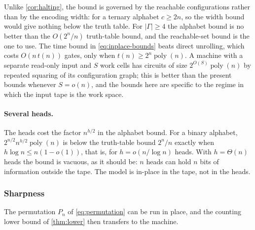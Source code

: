 \documentclass[11pt]{article}
\theoremstyle{definition}
\theoremstyle{remark}
\newcommand{\poly}{\operatorname{poly}}
\numberwithin{equation}{section}
\begin{document}
Unlike \cref{cor:halting}, the bound is governed by the reachable
configurations rather than by the encoding width: for a ternary
alphabet $c\geq2n$, so the width bound would give nothing below the
truth table.  For $|\Gamma|\geq4$ the alphabet bound is no better than
the $O(2^n/n)$ truth-table bound, and the reachable-set bound is the one
to use.  The time bound in \cref{eq:inplace-bounds} beats direct
unrolling, which costs $O(n\,t(n))$ gates, only when
$t(n)\geq2^n\poly(n)$.  A machine with a separate read-only input and
$S$ work cells has circuits of size $2^{O(S)}\poly(n)$ by repeated
squaring of its configuration graph; this is better than the present
bounds whenever $S=o(n)$, and the bounds here are specific to the regime
in which the input tape is the work space.

\paragraph{Several heads.}
The heads cost the factor $n^{h/2}$ in the alphabet bound.  For a binary
alphabet, $2^{n/2}n^{h/2}\poly(n)$ is below the truth-table bound
$2^n/n$ exactly when $h\log n\leq n(1-o(1))$, that is, for
$h=o(n/\log n)$ heads.  With $h=\Theta(n)$ heads the bound is vacuous,
as it should be: $n$ heads can hold $n$ bits of information outside
the tape.  The model is in-place in the tape, not in the heads.

\subsubsection{Sharpness}

The permutation $P_n$ of \cref{eq:permutation} can be run in place, and
the counting lower bound of \cref{thm:lower} then transfers to the
machine.
\end{document}
